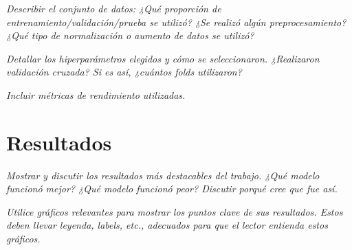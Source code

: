 \documentclass[11pt]{article}
\begin{document}
\textit{Describir el conjunto de datos: ¿Qué proporción de entrenamiento/validación/prueba se utilizó? ¿Se realizó algún preprocesamiento? ¿Qué tipo de normalización o aumento de datos se utilizó?}

\textit{Detallar los hiperparámetros elegidos y cómo se seleccionaron. ¿Realizaron validación cruzada? Si es así, ¿cuántos folds utilizaron?}

\textit{Incluir métricas de rendimiento utilizadas.}

\section{Resultados}
\textit{Mostrar y discutir los resultados más destacables del trabajo. ¿Qué modelo funcionó mejor? ¿Qué modelo funcionó peor? Discutir porqué cree que fue así.}

\textit{Utilice gráficos relevantes para mostrar los puntos clave de sus resultados. Estos deben llevar leyenda, labels, etc., adecuados para que el lector entienda estos gráficos.}
\end{document}
